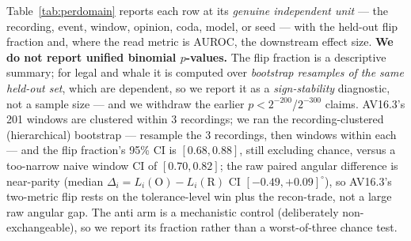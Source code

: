 \documentclass[10pt]{article} %
\theoremstyle{remark}
\begin{document}
Table~\ref{tab:perdomain} reports each row at its \emph{genuine independent unit} --- the
recording, event, window, opinion, coda, model, or seed --- with the held-out flip fraction
and, where the read metric is AUROC, the downstream effect size. \textbf{We do not report
unified binomial $p$-values.} The flip fraction is a descriptive summary; for legal and whale
it is computed over \emph{bootstrap resamples of the same held-out set}, which are dependent,
so we report it as a \emph{sign-stability} diagnostic, not a sample size --- and we withdraw
the earlier $p<2^{-200}$/$2^{-300}$ claims. AV16.3's 201 windows are clustered within 3
recordings; we ran the recording-clustered (hierarchical) bootstrap --- resample the 3
recordings, then windows within each --- and the flip fraction's 95\% CI is $[0.68,0.88]$,
still excluding chance, versus a too-narrow naive window CI of $[0.70,0.82]$; the raw paired
angular difference is near-parity (median $\Delta_i=L_i(\mathrm O)-L_i(\mathrm R)$ CI
$[-0.49,+0.09]^\circ$), so AV16.3's two-metric flip rests on the tolerance-level win plus the
recon-trade, not a large raw angular gap. The anti arm is a mechanistic control (deliberately
non-exchangeable), so we report its fraction rather than a worst-of-three chance test.
\end{document}
